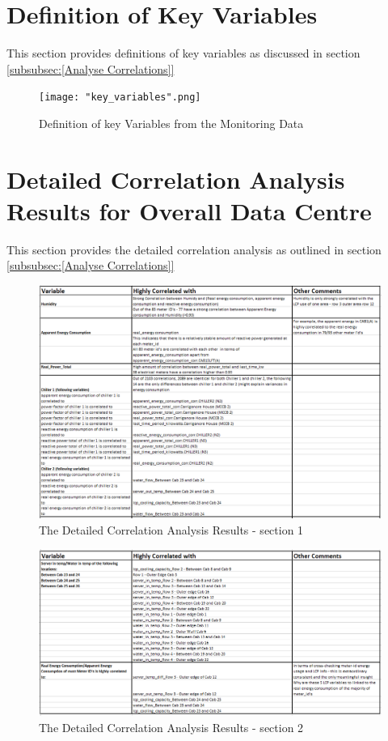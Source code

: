 \documentclass[12pt]{scrartcl}
\begin{document}
\section{Definition of Key Variables}
\label{sec:[Definition of key Variables]}

This section provides definitions of key variables as discussed in section \ref{subsubsec:[Analyse Correlations]}

\begin{figure}[h]
  \caption{Definition of key Variables from the Monitoring Data}
  \label{fig:key_variables}
  \centering
    \texttt{[image: "key\_variables".png]}
\end{figure} 



\section{Detailed Correlation Analysis Results for Overall Data Centre}
\label{sec:[Data Centre Correlation Analysis Results]}
This section provides the detailed correlation analysis as outlined in section \ref{subsubsec:[Analyse Correlations]}


\begin{figure}[H]
  \caption{The Detailed Correlation Analysis Results - section 1}
  \label{fig:Correlation_Analysis_1}
  \centering
    \includegraphics[scale=0.50]{Correlation_Analysis_1}
\end{figure} 

\begin{figure}[H]
  \caption{The Detailed Correlation Analysis Results - section 2}
  \label{fig:Correlation_Analysis_2}
  \centering
    \includegraphics[scale=0.50]{Correlation_Analysis_2}
\end{figure} 
\end{document}
